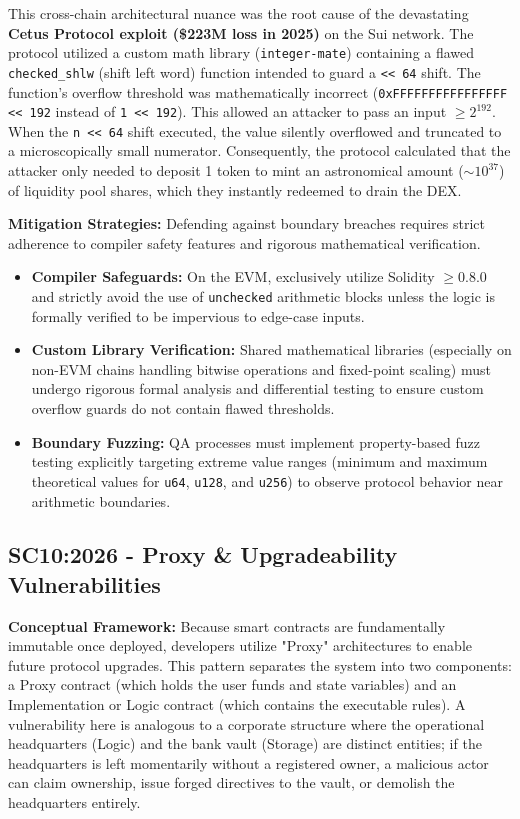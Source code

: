 This cross-chain architectural nuance was the root cause of the devastating \textbf{Cetus Protocol exploit (\$223M loss in 2025)} on the Sui network. The protocol utilized a custom math library (\texttt{integer-mate}) containing a flawed \texttt{checked\_shlw} (shift left word) function intended to guard a \texttt{<< 64} shift. The function's overflow threshold was mathematically incorrect (\texttt{0xFFFFFFFFFFFFFFFF << 192} instead of \texttt{1 << 192}). This allowed an attacker to pass an input $\ge 2^{192}$. When the \texttt{n << 64} shift executed, the value silently overflowed and truncated to a microscopically small numerator. Consequently, the protocol calculated that the attacker only needed to deposit 1 token to mint an astronomical amount ($\sim 10^{37}$) of liquidity pool shares, which they instantly redeemed to drain the DEX.

\textbf{Mitigation Strategies:} Defending against boundary breaches requires strict adherence to compiler safety features and rigorous mathematical verification.
\begin{itemize}
    \item \textbf{Compiler Safeguards:} On the EVM, exclusively utilize Solidity $\ge 0.8.0$ and strictly avoid the use of \texttt{unchecked} arithmetic blocks unless the logic is formally verified to be impervious to edge-case inputs.
    \item \textbf{Custom Library Verification:} Shared mathematical libraries (especially on non-EVM chains handling bitwise operations and fixed-point scaling) must undergo rigorous formal analysis and differential testing to ensure custom overflow guards do not contain flawed thresholds.
    \item \textbf{Boundary Fuzzing:} QA processes must implement property-based fuzz testing explicitly targeting extreme value ranges (minimum and maximum theoretical values for \texttt{u64}, \texttt{u128}, and \texttt{u256}) to observe protocol behavior near arithmetic boundaries.
\end{itemize}

\subsection{SC10:2026 - Proxy \& Upgradeability Vulnerabilities}
\textbf{Conceptual Framework:} Because smart contracts are fundamentally immutable once deployed, developers utilize "Proxy" architectures to enable future protocol upgrades. This pattern separates the system into two components: a Proxy contract (which holds the user funds and state variables) and an Implementation or Logic contract (which contains the executable rules). A vulnerability here is analogous to a corporate structure where the operational headquarters (Logic) and the bank vault (Storage) are distinct entities; if the headquarters is left momentarily without a registered owner, a malicious actor can claim ownership, issue forged directives to the vault, or demolish the headquarters entirely.

